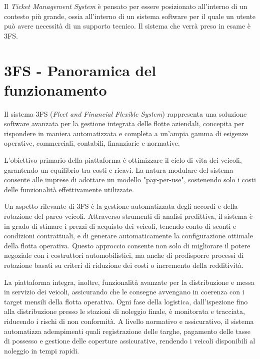 \setcounter{secnumdepth}{-1}

Il \textit{Ticket Management System} è pensato per essere posizionato all'interno di un contesto più grande, ossia all'interno di un sistema software
per il quale un utente può avere necessità di un supporto tecnico. Il sistema che verrà preso in esame è 3FS{\textsuperscript{\tiny\textcopyright}}.

\section{\texorpdfstring{3FS{\textsuperscript{\tiny\textcopyright}} - Panoramica del funzionamento}{3FS (c) - Panoramica del funzionamento}}
Il sistema 3FS{\textsuperscript{\tiny\textcopyright}} (\textit{Fleet and Financial Flexible System}) rappresenta una soluzione software avanzata per la gestione integrata delle flotte aziendali,
concepita per rispondere in maniera automatizzata e completa a un'ampia gamma di esigenze operative, commerciali, contabili, finanziarie e normative.

L'obiettivo primario della piattaforma è ottimizzare il ciclo di vita dei veicoli, garantendo un equilibrio tra costi e ricavi.
La natura modulare del sistema consente alle imprese di adottare un modello "pay-per-use", sostenendo solo i costi delle funzionalità 
effettivamente utilizzate.

Un aspetto rilevante di 3FS{\textsuperscript{\tiny\textcopyright}} è la gestione automatizzata degli accordi e della rotazione del parco veicoli. Attraverso strumenti di analisi
predittiva, il sistema è in grado di stimare i prezzi di acquisto dei veicoli, tenendo conto di sconti e condizioni contrattuali, e di
generare automaticamente la configurazione ottimale della flotta operativa. Questo approccio consente non solo di migliorare il potere negoziale
con i costruttori automobilistici, ma anche di predisporre processi di rotazione basati su criteri di riduzione dei costi o incremento della
redditività.

La piattaforma integra, inoltre, funzionalità avanzate per la distribuzione e messa in servizio dei veicoli, assicurando che le consegne
avvengano in coerenza con i target mensili della flotta operativa. Ogni fase della logistica, dall'ispezione fino alla distribuzione
presso le stazioni di noleggio finale, è monitorata e tracciata, riducendo i rischi di non conformità. A livello normativo e assicurativo,
il sistema automatizza adempimenti quali registrazione delle targhe, pagamento delle tasse di possesso e gestione delle coperture assicurative,
rendendo i veicoli disponibili al noleggio in tempi rapidi.

